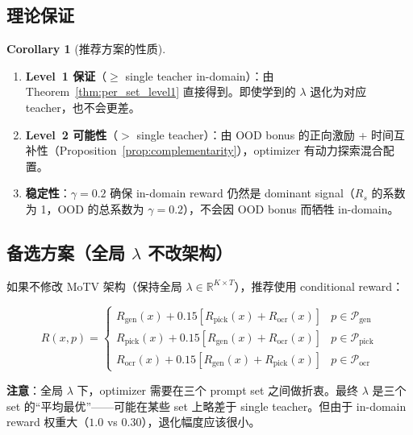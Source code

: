 \documentclass[11pt,a4paper]{article}
\newcommand{\R}{\mathbb{R}}
\newcommand{\reward}{R}
\theoremstyle{definition}
\newtheorem{corollary}{Corollary}
\begin{document}
\subsection{理论保证}

\begin{corollary}[推荐方案的性质]
\begin{enumerate}[leftmargin=1.5em]
\item \textbf{Level~1 保证}（$\geq$ single teacher in-domain）：由 Theorem~\ref{thm:per_set_level1} 直接得到。即使学到的 $\lambda$ 退化为对应 teacher，也不会更差。

\item \textbf{Level~2 可能性}（$>$ single teacher）：由 OOD bonus 的正向激励 + 时间互补性（Proposition~\ref{prop:complementarity}），optimizer 有动力探索混合配置。

\item \textbf{稳定性}：$\gamma = 0.2$ 确保 in-domain reward 仍然是 dominant signal（$R_s$ 的系数为 1，OOD 的总系数为 $\gamma = 0.2$），不会因 OOD bonus 而牺牲 in-domain。
\end{enumerate}
\end{corollary}

\subsection{备选方案（全局 $\lambda$ 不改架构）}

如果不修改 MoTV 架构（保持全局 $\lambda \in \R^{K \times T}$），推荐使用 conditional reward：

\begin{tcolorbox}[colback=blue!5, colframe=blue!40, title=备选方案（全局 $\lambda$）]
\begin{equation}
\reward(x, p) = \begin{cases}
R_{\mathrm{gen}}(x) + 0.15[R_{\mathrm{pick}}(x) + R_{\mathrm{ocr}}(x)] & p \in \mathcal{P}_{\mathrm{gen}} \\
R_{\mathrm{pick}}(x) + 0.15[R_{\mathrm{gen}}(x) + R_{\mathrm{ocr}}(x)] & p \in \mathcal{P}_{\mathrm{pick}} \\
R_{\mathrm{ocr}}(x) + 0.15[R_{\mathrm{gen}}(x) + R_{\mathrm{pick}}(x)] & p \in \mathcal{P}_{\mathrm{ocr}}
\end{cases}
\end{equation}

\textbf{注意}：全局 $\lambda$ 下，optimizer 需要在三个 prompt set 之间做折衷。最终 $\lambda$ 是三个 set 的``平均最优''——可能在某些 set 上略差于 single teacher。但由于 in-domain reward 权重大（$1.0$ vs $0.30$），退化幅度应该很小。
\end{tcolorbox}
\end{document}
